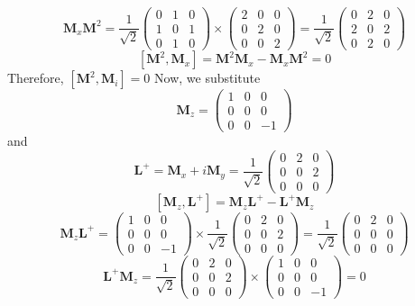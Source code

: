 $$
\mathbf{M}_{x} \mathbf{M}^{2}=\frac{1}{\sqrt{2}}\left(\begin{array}{lll}
0 & 1 & 0 \\
1 & 0 & 1 \\
0 & 1 & 0
\end{array}\right) \times\left(\begin{array}{lll}
2 & 0 & 0 \\
0 & 2 & 0 \\
0 & 0 & 2
\end{array}\right)=\frac{1}{\sqrt{2}}\left(\begin{array}{lll}
0 & 2 & 0 \\
2 & 0 & 2 \\
0 & 2 & 0
\end{array}\right)
$$
$$
\left[\mathbf{M}^{2}, \mathbf{M}_{x}\right]=\mathbf{M}^{2} \mathbf{M}_{x}-\mathbf{M}_{x} \mathbf{M}^{2}=0
$$
Therefore, $\left[\mathbf{M}^{2}, \mathbf{M}_{i}\right]=0$
Now, we substitute 
$$
\mathbf{M}_{z}=\left(\begin{array}{ccc}
1 & 0 & 0 \\
0 & 0 & 0 \\
0 & 0 & -1
\end{array}\right)
$$
and
$$
\mathbf{L}^{+}=\mathbf{M}_{x}+i \mathbf{M}_{y}=\frac{1}{\sqrt{2}}\left(\begin{array}{lll}
0 & 2 & 0 \\
0 & 0 & 2 \\
0 & 0 & 0
\end{array}\right)
$$
$$
\left[\mathbf{M}_{z}, \mathbf{L}^{+}\right]=\mathbf{M}_{z} \mathbf{L}^{+}-\mathbf{L}^{+} \mathbf{M}_{z}
$$
$$
\mathbf{M}_{z} \mathbf{L}^{+}=\left(\begin{array}{ccc}
1 & 0 & 0 \\
0 & 0 & 0 \\
0 & 0 & -1
\end{array}\right) \times \frac{1}{\sqrt{2}}\left(\begin{array}{ccc}
0 & 2 & 0 \\
0 & 0 & 2 \\
0 & 0 & 0
\end{array}\right)=\frac{1}{\sqrt{2}}\left(\begin{array}{lll}
0 & 2 & 0 \\
0 & 0 & 0 \\
0 & 0 & 0
\end{array}\right)
$$
$$
\mathbf{L}^{+} \mathbf{M}_{z}=\frac{1}{\sqrt{2}}\left(\begin{array}{ccc}
0 & 2 & 0 \\
0 & 0 & 2 \\
0 & 0 & 0
\end{array}\right) \times\left(\begin{array}{ccc}
1 & 0 & 0 \\
0 & 0 & 0 \\
0 & 0 & -1
\end{array}\right)=0
$$
